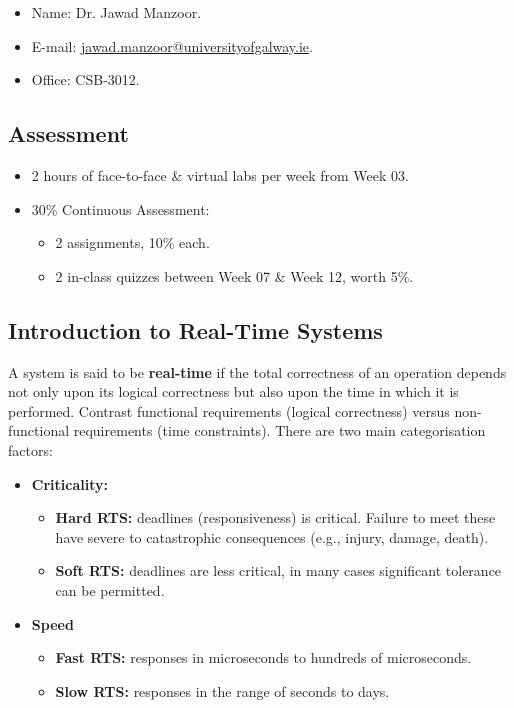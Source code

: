 \documentclass[a4paper,11pt]{article}
\begin{document}
\begin{itemize}
    \item   Name: Dr. Jawad Manzoor.
    \item   E-mail: \href{jawad.manzoor@universityofgalway.ie}{jawad.manzoor@universityofgalway.ie}.
    \item   Office: CSB-3012.
\end{itemize}

\subsection{Assessment}
\begin{itemize}
    \item   2 hours of face-to-face \& virtual labs per week from Week 03.
    \item   30\% Continuous Assessment:
            \begin{itemize}
                \item   2 assignments, 10\% each.
                \item   2 in-class quizzes between Week 07 \& Week 12, worth 5\%.
            \end{itemize}
\end{itemize}

\subsection{Introduction to Real-Time Systems}
A system is said to be \textbf{real-time} if the total correctness of an operation depends not only upon its logical correctness but also upon the time in which it is performed.
Contrast functional requirements (logical correctness) versus non-functional requirements (time constraints).
There are two main categorisation factors:
\begin{itemize}
    \item   \textbf{Criticality:}
            \begin{itemize}
                \item   \textbf{Hard RTS:} deadlines (responsiveness) is critical.
                        Failure to meet these have severe to catastrophic consequences (e.g., injury, damage, death).
                \item   \textbf{Soft RTS:} deadlines are less critical, in many cases significant tolerance can be permitted.
            \end{itemize}

    \item   \textbf{Speed}
            \begin{itemize}
                \item   \textbf{Fast RTS:} responses in microseconds to hundreds of microseconds.
                \item   \textbf{Slow RTS:} responses in the range of seconds to days.
            \end{itemize}
\end{itemize}
\end{document}

